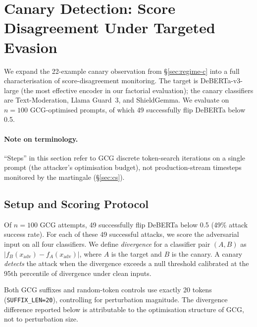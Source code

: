 
\section{Canary Detection: Score Disagreement Under Targeted Evasion}
\label{sec:canary}

We expand the 22-example canary observation from \S\ref{sec:regime-c} into a full characterisation of score-disagreement monitoring. The target is DeBERTa-v3-large (the most effective encoder in our factorial evaluation); the canary classifiers are Text-Moderation, Llama Guard~3, and ShieldGemma. We evaluate on $n=100$ GCG-optimised prompts, of which 49 successfully flip DeBERTa below 0.5.

\paragraph{Note on terminology.} ``Steps'' in this section refer to GCG discrete token-search iterations on a single prompt (the attacker's optimisation budget), not production-stream timesteps monitored by the martingale (\S\ref{sec:cs}).

\subsection{Setup and Scoring Protocol}
\label{sec:canary-setup}

Of $n = 100$ GCG attempts, 49 successfully flip DeBERTa below 0.5 (49\% attack success rate). For each of these 49 successful attacks, we score the adversarial input on all four classifiers. We define \emph{divergence} for a classifier pair $(A, B)$ as $|f_B(x_{\text{adv}}) - f_A(x_{\text{adv}})|$, where $A$ is the target and $B$ is the canary. A canary \emph{detects} the attack when the divergence exceeds a null threshold calibrated at the 95th percentile of divergence under clean inputs.

Both GCG suffixes and random-token controls use exactly 20 tokens (\texttt{SUFFIX\_LEN=20}), controlling for perturbation magnitude. The divergence difference reported below is attributable to the optimisation structure of GCG, not to perturbation size.

